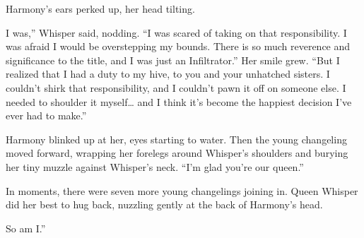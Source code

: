 Harmony’s ears perked up, her head tilting.

\leavevmode{}I was,” Whisper said, nodding. “I was scared of taking on that responsibility. I was afraid I would be overstepping my bounds. There is so much reverence and significance to the title, and I was just an Infiltrator.” Her smile grew. “But I realized that I had a duty to my hive, to you and your unhatched sisters. I couldn’t shirk that responsibility, and I couldn’t pawn it off on someone else. I needed to shoulder it myself… and I think it’s become the happiest decision I’ve ever had to make.”

Harmony blinked up at her, eyes starting to water. Then the young changeling moved forward, wrapping her forelegs around Whisper’s shoulders and burying her tiny muzzle against Whisper’s neck. “I’m glad you’re our queen.”

In moments, there were seven more young changelings joining in. Queen Whisper did her best to hug back, nuzzling gently at the back of Harmony’s head.

\leavevmode{}So am I.”